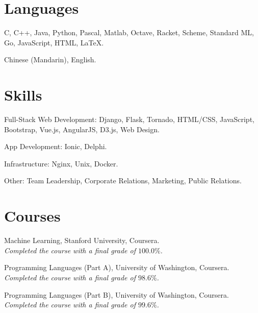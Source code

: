 \documentclass[letterpaper]{article}
\renewenvironment{itemize}{
  \begin{list}{}{
    \setlength{\leftmargin}{1.5em}
  }
}{
  \end{list}
}
\begin{document}
\section*{Languages}

\begin{itemize}
  \item C, C++, Java, Python, Pascal, Matlab, Octave, Racket, Scheme, Standard ML, Go, JavaScript, HTML, \LaTeX.
  \item Chinese (Mandarin), English.
\end{itemize}


\section*{Skills}

\begin{itemize}
  \item Full-Stack Web Development: Django, Flask, Tornado, HTML/CSS, JavaScript, Bootstrap, Vue.js, AngularJS, D3.js, Web Design.

  \item App Development: Ionic, Delphi.

  \item Infrastructure: Nginx, Unix, Docker.

  \item Other: Team Leadership, Corporate Relations, Marketing, Public Relations.
\end{itemize}

\section*{Courses}

\begin{itemize}
  \item Machine Learning, Stanford University, Coursera.\\
  \emph{Completed the course with a final grade of $100.0\%$.}

  \item Programming Languages (Part A), University of Washington, Coursera.\\
  \emph{Completed the course with a final grade of $98.6\%$.}

  \item Programming Languages (Part B), University of Washington, Coursera.\\
  \emph{Completed the course with a final grade of $99.6\%$.}
\end{itemize}


\bigskip

\end{document}

